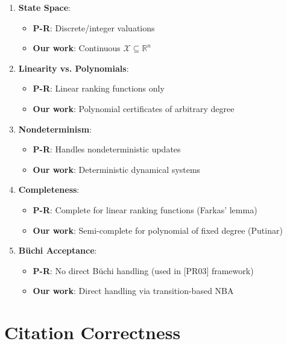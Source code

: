 \documentclass{article}
\begin{document}
\begin{enumerate}
    \item \textbf{State Space}:
    \begin{itemize}
        \item \textbf{P-R}: Discrete/integer valuations
        \item \textbf{Our work}: Continuous $\mathcal{X} \subseteq \mathbb{R}^n$
    \end{itemize}

    \item \textbf{Linearity vs. Polynomials}:
    \begin{itemize}
        \item \textbf{P-R}: Linear ranking functions only
        \item \textbf{Our work}: Polynomial certificates of arbitrary degree
    \end{itemize}

    \item \textbf{Nondeterminism}:
    \begin{itemize}
        \item \textbf{P-R}: Handles nondeterministic updates
        \item \textbf{Our work}: Deterministic dynamical systems
    \end{itemize}

    \item \textbf{Completeness}:
    \begin{itemize}
        \item \textbf{P-R}: Complete for linear ranking functions (Farkas' lemma)
        \item \textbf{Our work}: Semi-complete for polynomial of fixed degree (Putinar)
    \end{itemize}

    \item \textbf{Büchi Acceptance}:
    \begin{itemize}
        \item \textbf{P-R}: No direct Büchi handling (used in [PR03] framework)
        \item \textbf{Our work}: Direct handling via transition-based NBA
    \end{itemize}
\end{enumerate}

\section{Citation Correctness}
\end{document}
